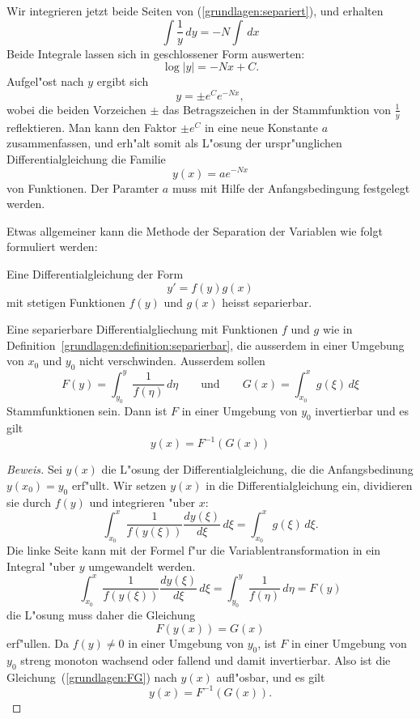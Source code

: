 Wir integrieren jetzt beide Seiten von (\ref{grundlagen:separiert}), und
erhalten 
\[
\int\frac1y\,dy=-N\int\,dx
\]
Beide Integrale lassen sich in geschlossener Form auswerten:
\[
\log|y|=-Nx+C.
\]
Aufgel"ost nach $y$ ergibt sich
\[
y=\pm e^{C}e^{-Nx},
\]
wobei die beiden Vorzeichen $\pm$ das Betragszeichen in der Stammfunktion
von $\frac1y$ reflektieren.
Man kann den Faktor $\pm e^{C}$ in eine neue Konstante $a$ zusammenfassen,
und erh"alt somit als L"osung der urspr"unglichen Differentialgleichung
die Familie
\[
y(x)=ae^{-Nx}
\]
von Funktionen.
Der Paramter $a$ muss mit Hilfe der Anfangsbedingung festgelegt werden.

Etwas allgemeiner kann die Methode der Separation der Variablen wie folgt
formuliert werden:
\begin{definition}
\label{grundlagen:definition:separierbar}
Eine Differentialgleichung der Form
\[
y'=f(y) g(x)
\]
mit stetigen Funktionen $f(y)$ und $g(x)$ heisst separierbar.
\end{definition}

\begin{satz}
Eine separierbare Differentialgliechung mit Funktionen $f$ und $g$ wie
in Definition~\ref{grundlagen:definition:separierbar},
die ausserdem in einer Umgebung von $x_0$ und $y_0$ nicht verschwinden.
Ausserdem sollen
\[
F(y)=\int_{y_0}^y \frac1{f(\eta)}\,d\eta
\qquad\text{und}\qquad
G(x)=\int_{x_0}^x g(\xi)\,d\xi
\]
Stammfunktionen sein.
Dann ist $F$ in einer Umgebung von $y_0$ invertierbar und es gilt
\[
y(x)=F^{-1}(G(x))
\]
\end{satz}

\begin{proof}[Beweis]
Sei $y(x)$ die L"osung der Differentialgleichung, die die Anfangsbedinung
$y(x_0)=y_0$ erf"ullt.
Wir setzen $y(x)$ in die Differentialgleichung ein,
dividieren sie durch $f(y)$ und integrieren "uber $x$:
\[
\int_{x_0}^x\frac1{f(y(\xi))}\frac{dy(\xi)}{d\xi}\,d\xi
=
\int_{x_0}^x g(\xi)\,d\xi.
\]
Die linke Seite kann mit der Formel f"ur die Variablentransformation in
ein Integral "uber $y$ umgewandelt werden.
\[
\int_{x_0}^x\frac1{f(y(\xi))}\frac{dy(\xi)}{d\xi}\,d\xi
=
\int_{y_0}^y \frac1{f(\eta)}\,d\eta=F(y)
\]
die L"osung muss daher die Gleichung
\begin{equation}
F(y(x))=G(x)
\label{grundlagen:FG}
\end{equation}
erf"ullen.
Da $f(y)\ne 0$ in einer Umgebung von $y_0$, ist $F$ in einer Umgebung von $y_0$
streng monoton wachsend oder fallend und damit invertierbar.
Also ist die Gleichung~(\ref{grundlagen:FG}) nach $y(x)$ aufl"osbar, und
es gilt
\[
y(x)=F^{-1}(G(x)).
\]
\end{proof}

